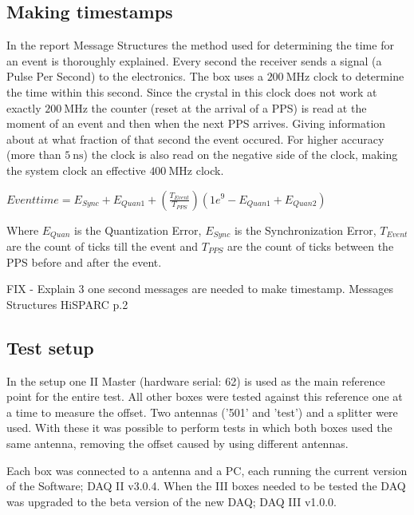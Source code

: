\subsection{Making timestamps}
\label{sub:gps_timestamps}

In the report Message Structures \hisparc the method used for
determining the time for an event is thoroughly explained. Every second
the \gps receiver sends a signal (a Pulse Per Second) to the \hisparc
electronics. The \hisparc box uses a $\SI{200}{\mega\hertz}$ clock to
determine the time within this second. Since the crystal in this clock
does not work at exactly $\SI{200}{\mega\hertz}$ the counter (reset at
the arrival of a PPS) is read at the moment of an event and then when
the next PPS arrives. Giving information about at what fraction of that
second the event occured. For higher accuracy (more than
$\SI{5}{\nano\second}$) the clock is also read on the negative side of
the clock, making the system clock an effective
$\SI{400}{\mega\hertz}$ clock.

$Event time = E_{Sync} + E_{Quan1} + (\frac{T_{Event}}{T_{PPS}}) (1e^9 -
E_{Quan1} + E_{Quan2})$

Where $E_{Quan}$ is the Quantization Error, $E_{Sync}$ is the
Synchronization Error, $T_{Event}$ are the count of ticks till the event
and $T_{PPS}$ are the count of ticks between the PPS before and after
the event.

FIX - Explain 3 one second messages are needed to make timestamp.
Messages Structures HiSPARC p.2


\subsection{Test setup}
\label{sub:gps_test_setup}

In the setup one \hisparc II Master (hardware serial: 62) is used as the
main reference point for the entire test. All other \hisparc boxes were
tested against this reference one at a time to measure the offset. Two
\gps antennas ('501' and 'test') and a \gps splitter were used. With
these it was possible to perform tests in which both \hisparc boxes used
the same \gps antenna, removing the offset caused by using different
\gps antennas.

Each \hisparc box was connected to a \gps antenna and a PC, each running
the current version of the \hisparc Software; \hisparc DAQ II v3.0.4.
When the \hisparc III boxes needed to be tested the DAQ was upgraded to
the beta version of the new DAQ; \hisparc DAQ III v1.0.0.

